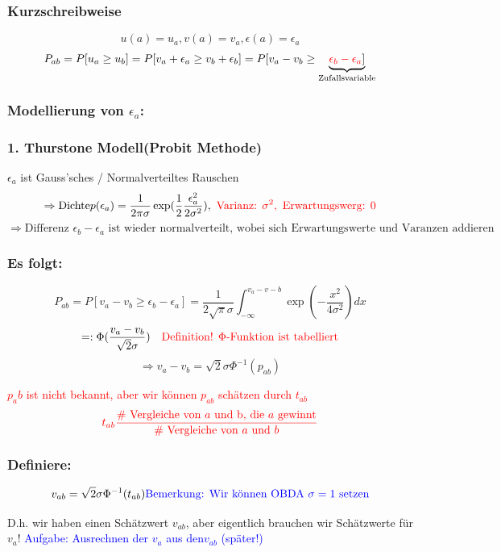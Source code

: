 	\subsubsection*{Kurzschreibweise}
		\[ u(a) = u_a, v(a) = v_a, \epsilon(a)= \epsilon_a\]
		\[ P_{ab} = P[u_a \geq u_b] = P[v_a + \epsilon_a \geq v_b + \epsilon_b] =P[v_a - v_b \geq \underbrace{\textcolor{red}{\epsilon_b -\epsilon_a}]}_{\text{Zufallsvariable}}\]
				
	\subsubsection*{Modellierung von $ \epsilon_a $:}
	\subsubsection*{1. Thurstone Modell(Probit Methode)}
	
		$ \epsilon_a $ ist Gauss'sches / Normalverteiltes Rauschen
		\[ \Rightarrow \text{Dichte} p(\epsilon_a)= \frac{1}{2 \pi \sigma} \exp(\frac{1}{2}\frac{\epsilon_a^2}{2 \sigma^2}), \textcolor{red}{\text{ Varianz: } \sigma^2, \text{ Erwartungswerg: } 0}\]
		\[ \Rightarrow \text{Differenz } \epsilon_b - \epsilon_a \text{ ist wieder normalverteilt, wobei sich Erwartungswerte und Varanzen addieren} \]
	
		
	\subsubsection*{Es folgt:}
		\[ P_{ab}  = P[v_a -v_b \geq \epsilon_b - \epsilon_a] =  \frac{1}{2 \sqrt{\pi} \sigma} \int_{-\infty}^{v_a - v-b} \exp(-\frac{x^2}{4 \sigma^2}) dx\]
		\[ =: \Phi (\frac{v_a - v_b}{\sqrt{2} \sigma}) \quad \textcolor{red}{\text{Definition! } \Phi \text{-Funktion ist tabelliert}}\]
		\[ \Rightarrow v_a -v_b = \sqrt{2} \sigma \Phi^{-1} (p_{ab})\]
		
		\textcolor{red}{$ p_ab $ ist nicht bekannt, aber wir können $ p_{ab} $ schätzen durch $ t_{ab} $ }
		\[ \textcolor{red}{t_{ab} \frac{\text{\# Vergleiche von $ a $ und b, die $ a $ gewinnt}}{\text{\# Vergleiche von $ a $ und $ b $}}} \]
		
	\subsubsection*{Definiere:}
		\[ v_{ab} = \sqrt{2} \sigma \Phi^{-1} (t_{ab}) \text{\textcolor{blue}{Bemerkung: Wir können OBDA $ \sigma = 1 $ setzen}}\]
		
		D.h. wir haben einen Schätzwert $ v_{ab} $, aber eigentlich brauchen wir Schätzwerte für $ v_a $!
		\textcolor{blue}{Aufgabe: Ausrechnen der $ v_a $ aus den$  v_{ab} $ (später!)}
		
